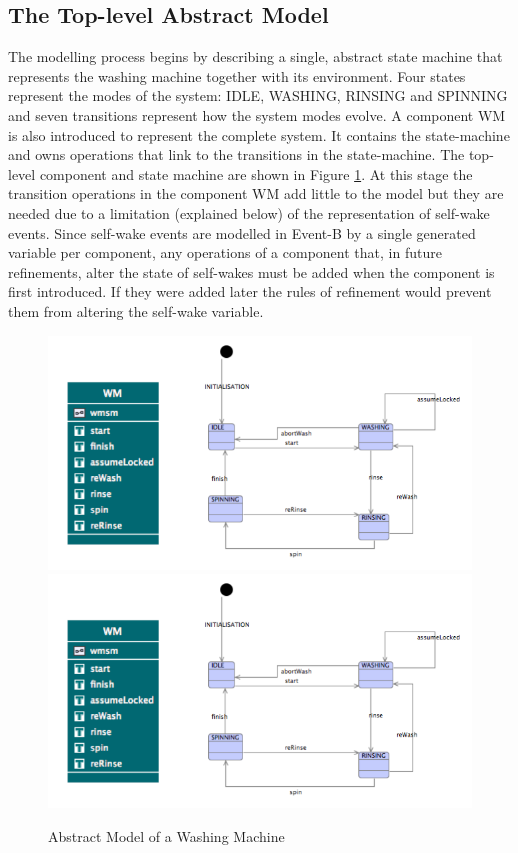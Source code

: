 \subsection{The Top-level Abstract Model}
\label{sec:component_diagrams-tutorial_topLevelAbstractModel}


The modelling process begins by describing a single, abstract state machine that represents the washing machine together with its environment. Four states represent the modes of the system: IDLE, WASHING, RINSING and SPINNING and seven transitions represent how the system modes evolve. A component WM is also introduced to represent the complete system. It contains the state-machine and owns operations that link to the transitions in the state-machine. The top-level component and state machine are shown in Figure \ref{fig:AbstractModelOfAWashingMachine}.
At this stage the transition operations in the component WM add little to the model but they are needed due to a limitation (explained below) of the representation of self-wake events. Since self-wake events are modelled in Event-B by a single generated variable per component, any operations of a component that, in future refinements, alter the state of self-wakes must be added when the component is first introduced. If they were added later the rules of refinement would prevent them from altering the self-wake variable.

 \begin{figure}[!htbp]
  \centering
  \ifplastex
  \includegraphics[width=1024]{figures/image13.png}
  \else
  \includegraphics[width=1\textwidth]{figures/image13.png}
  \fi
  \caption{Abstract Model of a Washing Machine}
  \label{fig:AbstractModelOfAWashingMachine}
\end{figure} 

